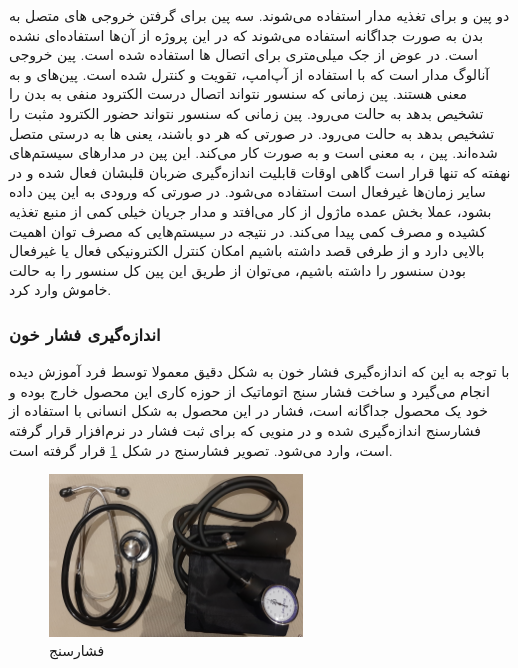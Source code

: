 دو پین  و  برای تغذیه مدار استفاده می‌شوند.  سه پین  برای گرفتن خروجی های متصل به بدن به صورت جداگانه استفاده می‌شوند که در این پروژه از آن‌ها استفاده‌ای نشده است. در عوض از جک  میلی‌متری برای اتصال ها استفاده شده است. پین  خروجی آنالوگ مدار است که با استفاده از آپ‌امپ، تقویت و کنترل شده است. پین‌های 
و
به معنی  هستند. پین  زمانی که سنسور نتواند اتصال درست الکترود منفی به بدن را تشخیص بدهد به حالت  می‌رود. پین  زمانی که سنسور نتواند حضور الکترود مثبت را تشخیص بدهد به حالت  می‌رود. در صورتی که هر دو  باشند، یعنی ها به درستی متصل شده‌اند.
پین ، به معنی  است و به صورت  کار می‌کند. این پین در مدارهای سیستم‌های نهفته که تنها قرار است گاهی اوقات قابلیت اندازه‌گیری ضربان قلبشان فعال شده و در سایر زمان‌ها غیرفعال است استفاده می‌شود. در صورتی که ورودی  به این پین داده بشود، عملا بخش عمده ماژول از کار می‌افتد و مدار جریان خیلی کمی از منبع تغذیه کشیده و مصرف کمی پیدا می‌کند. در نتیجه در سیستم‌هایی که مصرف توان اهمیت بالایی دارد و از طرفی قصد داشته باشیم امکان کنترل الکترونیکی فعال یا غیرفعال بودن سنسور را داشته باشیم، می‌توان از طریق این پین کل سنسور را به حالت خاموش وارد کرد.

\subsubsection{انداز‌ه‌گیری فشار خون }

با توجه به این که اندازه‌گیری فشار خون به شکل دقیق معمولا توسط فرد آموزش دیده انجام می‌گیرد و ساخت فشار سنج اتوماتیک از حوزه کاری این محصول خارج بوده و خود یک محصول جداگانه است، فشار در این محصول به شکل انسانی با استفاده از فشارسنج اندازه‌گیری شده و در منویی که برای ثبت فشار در نرم‌افزار قرار گرفته است، وارد می‌شود. تصویر فشارسنج در شکل \ref{fig:12} قرار گرفته است.



\begin{figure}[h]
	\centering
	\includegraphics[width=0.6\textwidth]{figs/cuff.jpg}
	
	\caption{فشارسنج}
	\label{fig:12}
\end{figure}




